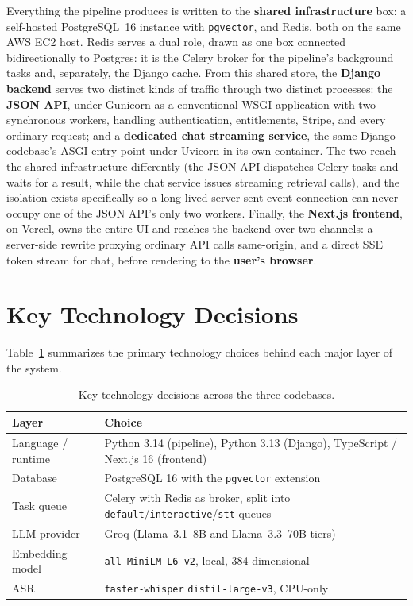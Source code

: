 Everything the pipeline produces is written to the \textbf{shared
infrastructure} box: a self-hosted PostgreSQL~16 instance with
\texttt{pgvector}, and Redis, both on the same AWS EC2 host. Redis serves a
dual role, drawn as one box connected bidirectionally to Postgres: it is
the Celery broker for the pipeline's background tasks and, separately, the
Django cache. From this shared store, the \textbf{Django backend} serves
two distinct kinds of traffic through two distinct processes: the
\textbf{JSON API}, under Gunicorn as a conventional WSGI application with
two synchronous workers, handling authentication, entitlements, Stripe, and
every ordinary request; and a \textbf{dedicated chat streaming service},
the same Django codebase's ASGI entry point under Uvicorn in its own
container. The two reach the shared infrastructure differently (the JSON
API dispatches Celery tasks and waits for a result, while the chat service
issues streaming retrieval calls), and the isolation exists specifically so
a long-lived server-sent-event connection can never occupy one of the JSON
API's only two workers. Finally, the \textbf{Next.js frontend}, on Vercel,
owns the entire UI and reaches the backend over two channels: a server-side
rewrite proxying ordinary API calls same-origin, and a direct SSE token
stream for chat, before rendering to the \textbf{user's browser}.

\section{Key Technology Decisions}
\label{sec:arch-tech-decisions}

Table~\ref{tab:techstack} summarizes the primary technology choices behind
each major layer of the system.

\begin{table}[htbp]
\centering
\caption{Key technology decisions across the three codebases.}
\label{tab:techstack}
\begin{tabular}{|p{3.8cm}|p{11cm}|}
\hline
\textbf{Layer} & \textbf{Choice} \\
\hline
Language / runtime & Python 3.14 (pipeline), Python 3.13 (Django), TypeScript / Next.js 16 (frontend) \\
\hline
Database & PostgreSQL 16 with the \texttt{pgvector} extension \\
\hline
Task queue & Celery with Redis as broker, split into \texttt{default}/\texttt{interactive}/\texttt{stt} queues \\
\hline
LLM provider & Groq (Llama~3.1~8B and Llama~3.3~70B tiers) \\
\hline
Embedding model & \texttt{all-MiniLM-L6-v2}, local, 384-dimensional \\
\hline
ASR & \texttt{faster-whisper} \texttt{distil-large-v3}, CPU-only \\
\hline
\end{tabular}
\end{table}


